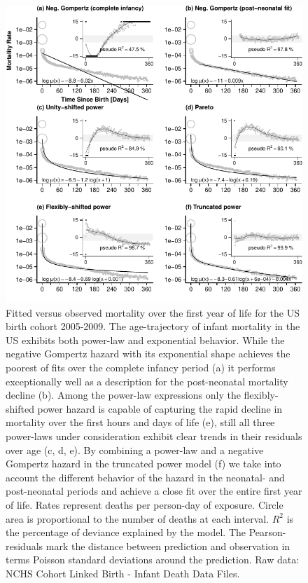 \documentclass[smallextended]{svjour3} %
\makeatletter
\def\maxwidth{\ifdim\Gin@nat@width>\linewidth\linewidth
\else\Gin@nat@width\fi}
\let\Oldincludegraphics\includegraphics
\renewcommand{\includegraphics}[1]{\Oldincludegraphics[width=\maxwidth]{#1}}
\makeatother
\begin{document}
\begin{figure}
\centering
\includegraphics{fig/plot_compare_models.pdf}
\caption{\label{fig:plot-evidence}Fitted versus observed mortality over the
first year of life for the US birth cohort 2005-2009. The age-trajectory
of infant mortality in the US exhibits both power-law and exponential
behavior. While the negative Gompertz hazard with its exponential shape
achieves the poorest of fits over the complete infancy period (a) it
performs exceptionally well as a description for the post-neonatal
mortality decline (b). Among the power-law expressions only the
flexibly-shifted power hazard is capable of capturing the rapid decline
in mortality over the first hours and days of life (e), still all three
power-laws under consideration exhibit clear trends in their residuals
over age (c, d, e). By combining a power-law and a negative Gompertz
hazard in the truncated power model (f) we take into account the
different behavior of the hazard in the neonatal- and post-neonatal
periods and achieve a close fit over the entire first year of life.
Rates represent deaths per person-day of exposure. Circle area is
proportional to the number of deaths at each interval. \(R^2\) is the
percentage of deviance explained by the model. The Pearson-residuals
mark the distance between prediction and observation in terms Poisson
standard deviations around the prediction. Raw data: NCHS Cohort Linked
Birth - Infant Death Data Files.}
\end{figure}
\end{document}
